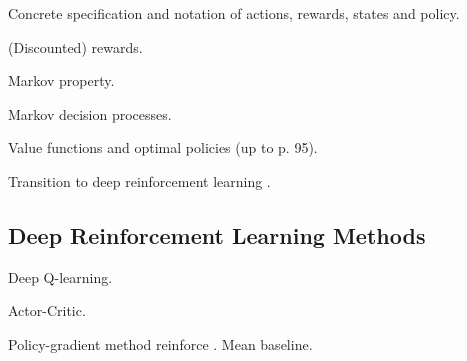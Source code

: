 Concrete specification and notation of actions, rewards, states and policy.

(Discounted) rewards.

Markov property.

Markov decision processes.

Value functions and optimal policies (up to p. 95).

Transition to deep reinforcement learning \parencite{lecun2015deep}.

\subsection{Deep Reinforcement Learning Methods}

Deep Q-learning. 

Actor-Critic.

Policy-gradient method reinforce \parencite{williams1992simple, sutton2018reinforcement}. Mean baseline. 
